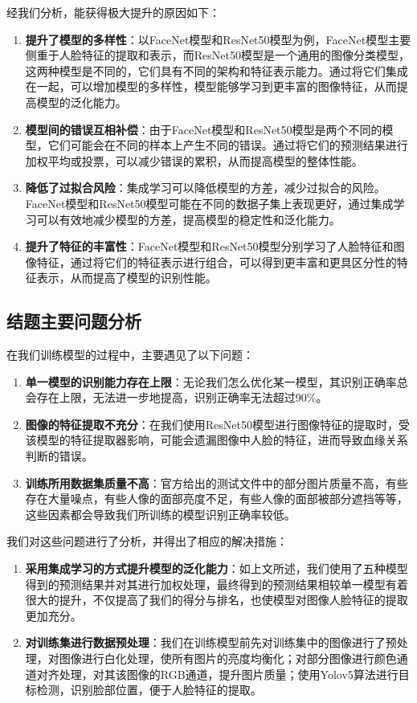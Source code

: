 \documentclass[UTF8]{ctexart}
\begin{document}
经我们分析，能获得极大提升的原因如下：
\begin{enumerate}
  \item \textbf{提升了模型的多样性}：以FaceNet模型和ResNet50模型为例，FaceNet模型主要侧重于人脸特征的提取和表示，而ResNet50模型是一个通用的图像分类模型，这两种模型是不同的，它们具有不同的架构和特征表示能力。通过将它们集成在一起，可以增加模型的多样性，模型能够学习到更丰富的图像特征，从而提高模型的泛化能力。
  \item \textbf{模型间的错误互相补偿}：由于FaceNet模型和ResNet50模型是两个不同的模型，它们可能会在不同的样本上产生不同的错误。通过将它们的预测结果进行加权平均或投票，可以减少错误的累积，从而提高模型的整体性能。
  \item \textbf{降低了过拟合风险}：集成学习可以降低模型的方差，减少过拟合的风险。FaceNet模型和ResNet50模型可能在不同的数据子集上表现更好，通过集成学习可以有效地减少模型的方差，提高模型的稳定性和泛化能力。
  \item \textbf{提升了特征的丰富性}：FaceNet模型和ResNet50模型分别学习了人脸特征和图像特征，通过将它们的特征表示进行组合，可以得到更丰富和更具区分性的特征表示，从而提高了模型的识别性能。
\end{enumerate}

\subsection{结题主要问题分析}
在我们训练模型的过程中，主要遇见了以下问题：
\begin{enumerate}
  \item \textbf{单一模型的识别能力存在上限}：无论我们怎么优化某一模型，其识别正确率总会存在上限，无法进一步地提高，识别正确率无法超过90\%。
  \item \textbf{图像的特征提取不充分}：在我们使用ResNet50模型进行图像特征的提取时，受该模型的特征提取器影响，可能会遗漏图像中人脸的特征，进而导致血缘关系判断的错误。
  \item \textbf{训练所用数据集质量不高}：官方给出的测试文件中的部分图片质量不高，有些存在大量噪点，有些人像的面部亮度不足，有些人像的面部被部分遮挡等等，这些因素都会导致我们所训练的模型识别正确率较低。
\end{enumerate}

我们对这些问题进行了分析，并得出了相应的解决措施：
\begin{enumerate}
  \item \textbf{采用集成学习的方式提升模型的泛化能力}：如上文所述，我们使用了五种模型得到的预测结果并对其进行加权处理，最终得到的预测结果相较单一模型有着很大的提升，不仅提高了我们的得分与排名，也使模型对图像人脸特征的提取更加充分。
  \item \textbf{对训练集进行数据预处理}：我们在训练模型前先对训练集中的图像进行了预处理，对图像进行白化处理，使所有图片的亮度均衡化；对部分图像进行颜色通道对齐处理，对其该图像的RGB通道，提升图片质量；使用Yolov5算法进行目标检测，识别脸部位置，便于人脸特征的提取。
\end{enumerate}
\end{document}
